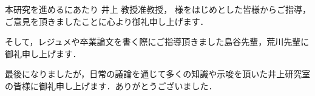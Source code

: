 \theacknowledgments

本研究を進めるにあたり 井上 教授准教授， 様をはじめとした皆様からご指導，ご意見を頂きましたことに心より御礼申し上げます．

そして，レジュメや卒業論文を書く際にご指導頂きました島谷先輩，荒川先輩に御礼申し上げます．

最後になりましたが，日常の議論を通じて多くの知識や示唆を頂いた井上研究室の皆様に御礼申し上げます．ありがとうございました．
